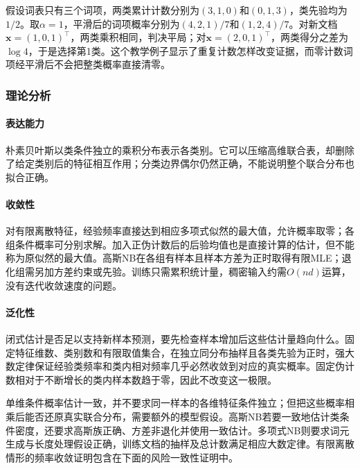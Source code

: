 假设词表只有三个词项，两类累计计数分别为$(3,1,0)$和$(0,1,3)$，类先验均为$1/2$。取$\alpha=1$，平滑后的词项概率分别为$(4,2,1)/7$和$(1,2,4)/7$。对新文档$\bm{x}=(1,0,1)^{\top}$，两类乘积相同，判决平局；对$\bm{x}=(2,0,1)^{\top}$，两类得分之差为$\log4$，于是选择第1类。这个教学例子显示了重复计数怎样改变证据，而零计数词项经平滑后不会把整类概率直接清零。

\subsubsection{理论分析}
\label{sec:classification-naive-bayes-theory}

\paragraph{表达能力}
朴素贝叶斯以类条件独立的乘积分布表示各类别。它可以压缩高维联合表，却删除了给定类别后的特征相互作用；分类边界偶尔仍然正确，不能说明整个联合分布也拟合正确。

\paragraph{收敛性}
对有限离散特征，经验频率直接达到相应多项式似然的最大值，允许概率取零；各组条件概率可分别求解。加入正伪计数后的后验均值也是直接计算的估计，但不能称为原似然的最大值。高斯NB在各组有样本且样本方差为正时取得有限MLE；退化组需另加方差约束或先验。训练只需累积统计量，稠密输入约需$O(nd)$运算，没有迭代收敛速度的问题。

\paragraph{泛化性}
闭式估计是否足以支持新样本预测，要先检查样本增加后这些估计量趋向什么。固定特征维数、类别数和有限取值集合，在独立同分布抽样且各类先验为正时，强大数定律保证经验类频率和类内相对频率几乎必然收敛到对应的真实概率。固定伪计数相对于不断增长的类内样本数趋于零，因此不改变这一极限。

单维条件概率估计一致，并不要求同一样本的各维特征条件独立；但把这些概率相乘后能否还原真实联合分布，需要额外的模型假设。高斯NB若要一致地估计类条件密度，还要求高斯族正确、方差非退化并使用一致估计。多项式NB则要求词元生成与长度处理假设正确，训练文档的抽样及总计数满足相应大数定律。有限离散情形的频率收敛证明包含在下面的风险一致性证明中。

